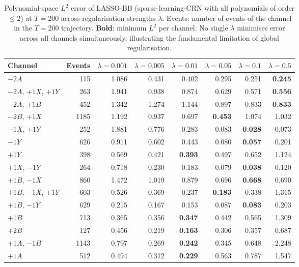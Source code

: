 \begin{table}[htbp]
\centering
\small
\caption{%
  Polynomial-space $L^2$ error of LASSO-BB (sparse-learning-CRN with all polynomials of order $\le 2$) at $T{=}200$
  across regularisation strengths $\lambda$.
  Events: number of events of the channel in the $T{=}200$ trajectory.
  \textbf{Bold}: minimum $L^2$ per channel.
  No single $\lambda$ minimises error across all channels simultaneously,
  illustrating the fundamental limitation of global regularisation.
}
\label{tab:lasso-lambda-sweep}
\begin{tabular}{lrrrrrrr}
\toprule
Channel & Events & $\lambda=0.001$ & $\lambda=0.005$ & $\lambda=0.01$ & $\lambda=0.05$ & $\lambda=0.1$ & $\lambda=0.5$ \\
\midrule
$-2A$ & 115 & 1.086 & 0.431 & 0.402 & 0.295 & 0.251 & \textbf{0.245} \\
$-2A$, $+1X$, $+1Y$ & 263 & 1.941 & 0.938 & 0.874 & 0.629 & 0.571 & \textbf{0.556} \\
$-2A$, $+1B$ & 452 & 1.342 & 1.274 & 1.144 & 0.897 & 0.833 & \textbf{0.833} \\
$-2B$, $+1X$ & 1185 & 1.192 & 0.937 & 0.697 & \textbf{0.453} & 1.074 & 1.032 \\
$-1X$, $+1Y$ & 252 & 1.881 & 0.776 & 0.283 & 0.083 & \textbf{0.028} & 0.073 \\
$-1Y$ & 626 & 0.911 & 0.602 & 0.443 & 0.080 & \textbf{0.057} & 0.201 \\
$+1Y$ & 398 & 0.569 & 0.421 & \textbf{0.393} & 0.497 & 0.652 & 1.124 \\
$+1X$, $-1Y$ & 264 & 0.718 & 0.230 & 0.183 & 0.079 & \textbf{0.038} & 0.120 \\
$+1B$, $-1X$ & 860 & 1.472 & 1.019 & 0.879 & 0.696 & \textbf{0.668} & 0.690 \\
$+1B$, $-1X$, $+1Y$ & 603 & 0.526 & 0.369 & 0.237 & \textbf{0.183} & 0.338 & 1.315 \\
$+1B$, $-1Y$ & 629 & 0.215 & 0.167 & 0.153 & 0.087 & \textbf{0.083} & 0.203 \\
$+1B$ & 713 & 0.365 & 0.356 & \textbf{0.347} & 0.442 & 0.565 & 1.309 \\
$+2B$ & 127 & 0.456 & 0.219 & \textbf{0.163} & 0.306 & 0.357 & 0.687 \\
$+1A$, $-1B$ & 1143 & 0.797 & 0.269 & \textbf{0.242} & 0.345 & 0.648 & 2.248 \\
$+1A$ & 512 & 0.494 & 0.312 & \textbf{0.229} & 0.563 & 0.787 & 1.547 \\
\bottomrule
\end{tabular}
\end{table}